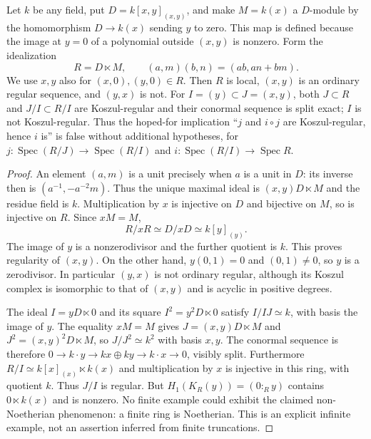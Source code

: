 \begin{example}\label{SA23-C-5}
Let $k$ be any field, put $D=k[x,y]_{(x,y)}$, and make $M=k(x)$ a
$D$-module by the homomorphism $D\to k(x)$ sending $y$ to zero.
This map is defined because the image at $y=0$ of a polynomial outside
$(x,y)$ is nonzero.  Form the idealization
\[
 R=D\ltimes M,\qquad
 (a,m)(b,n)=(ab,an+bm).
\]
We use $x,y$ also for $(x,0),(y,0)\in R$.  Then $R$ is local,
$(x,y)$ is an ordinary regular sequence, and $(y,x)$ is not.  For
$I=(y)\subset J=(x,y)$, both $J\subset R$ and $J/I\subset R/I$
are Koszul-regular and their conormal sequence is split exact; $I$ is
not Koszul-regular.  Thus the hoped-for implication
``$j$ and $i\circ j$ are Koszul-regular, hence $i$ is''
is false without additional hypotheses, for
$j:\operatorname{Spec}(R/J)\to\operatorname{Spec}(R/I)$ and
$i:\operatorname{Spec}(R/I)\to\operatorname{Spec}R$.
\end{example}
\begin{proof}
An element $(a,m)$ is a unit precisely when $a$ is a unit in $D$:
its inverse then is $(a^{-1},-a^{-2}m)$.  Thus the unique maximal ideal
is $(x,y)D\ltimes M$ and the residue field is $k$.
Multiplication by $x$ is injective on $D$ and bijective on $M$, so is
injective on $R$.  Since $xM=M$,
\[
 R/xR\simeq D/xD\simeq k[y]_{(y)}.
\]
The image of $y$ is a nonzerodivisor and the further quotient is $k$.
This proves regularity of $(x,y)$.  On the other hand, $y(0,1)=0$
and $(0,1)\ne0$, so $y$ is a zerodivisor.  In particular $(y,x)$
is not ordinary regular, although its Koszul complex is isomorphic
to that of $(x,y)$ and is acyclic in positive degrees.

The ideal $I=yD\ltimes0$ and its square $I^2=y^2D\ltimes0$ satisfy
$I/IJ\simeq k$, with basis the image of $y$.  The equality
$xM=M$ gives $J=(x,y)D\ltimes M$ and
$J^2=(x,y)^2D\ltimes M$, so $J/J^2\simeq k^2$ with basis $x,y$.
The conormal sequence is therefore
$0\to k\cdot y\to kx\oplus ky\to k\cdot x\to0$, visibly split.
Furthermore
$R/I\simeq k[x]_{(x)}\ltimes k(x)$ and multiplication by $x$ is
injective in this ring, with quotient $k$.  Thus $J/I$ is regular.
But $H_1(K_R(y))=(0:_R y)$ contains $0\ltimes k(x)$ and is nonzero.
No finite example could exhibit the claimed non-Noetherian phenomenon:
a finite ring is Noetherian.  This is an explicit infinite example,
not an assertion inferred from finite truncations.
\end{proof}

